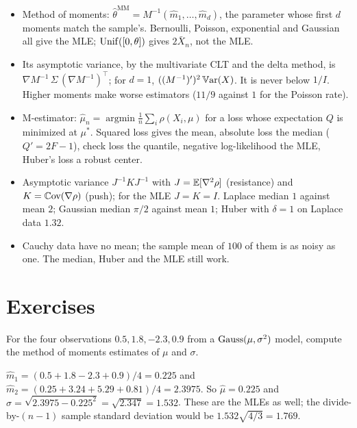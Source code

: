 \begin{itemize}[nosep]
\item Method of moments: $\hat{\theta}^{\text{MM}} = M^{-1}(\hat{m}_1, \ldots, \hat{m}_d)$, the parameter whose first $d$ moments match the sample's. Bernoulli, Poisson, exponential and Gaussian all give the MLE; $\mathrm{Unif}([0, \theta])$ gives $2\bar{X}_n$, not the MLE.
\item Its asymptotic variance, by the multivariate CLT and the delta method, is $\nabla M^{-1}\,\Sigma\,(\nabla M^{-1})^\top$; for $d = 1$, $((M^{-1})')^2\operatorname*{\mathbb{V}\text{ar}}(X)$. It is never below $1/I$. Higher moments make worse estimators ($11/9$ against $1$ for the Poisson rate).
\item M-estimator: $\hat{\mu}_n = \operatorname{argmin}\frac1n\sum_i\rho(X_i, \mu)$ for a loss whose expectation $Q$ is minimized at $\mu^*$. Squared loss gives the mean, absolute loss the median ($Q' = 2F - 1$), check loss the quantile, negative log-likelihood the MLE, Huber's loss a robust center.
\item Asymptotic variance $J^{-1}KJ^{-1}$ with $J = \operatorname*{\mathbb{E}}[\nabla^2\rho]$ (resistance) and $K = \operatorname*{\mathbb{C}\text{ov}}(\nabla\rho)$ (push); for the MLE $J = K = I$. Laplace median $1$ against mean $2$; Gaussian median $\pi/2$ against mean $1$; Huber with $\delta = 1$ on Laplace data $1.32$.
\item Cauchy data have no mean; the sample mean of $100$ of them is as noisy as one. The median, Huber and the MLE still work.
\end{itemize}

\section{Exercises}
\label{sec:mom-exercises}

\begin{exercise}
\label{ex:mom-gauss-data}
For the four observations $0.5, 1.8, -2.3, 0.9$ from a $\text{Gauss}(\mu, \sigma^2)$ model, compute the method of moments estimates of $\mu$ and $\sigma$.
\end{exercise}
\begin{solution}
$\hat{m}_1 = (0.5 + 1.8 - 2.3 + 0.9)/4 = 0.225$ and $\hat{m}_2 = (0.25 + 3.24 + 5.29 + 0.81)/4 = 2.3975$. So $\hat{\mu} = 0.225$ and $\hat{\sigma} = \sqrt{2.3975 - 0.225^2} = \sqrt{2.347} = 1.532$. These are the MLEs as well; the divide-by-$(n-1)$ sample standard deviation would be $1.532\sqrt{4/3} = 1.769$.
\end{solution}

